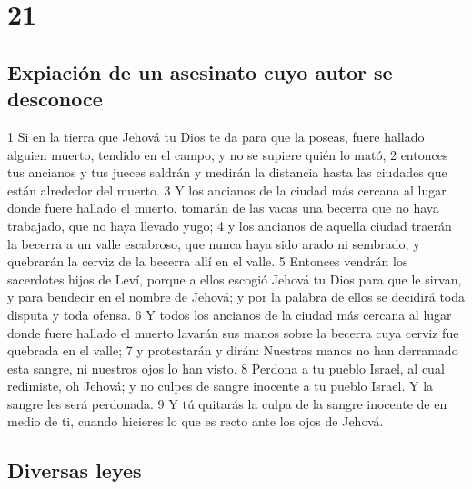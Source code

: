 \chapter{21}

\section{Expiación de un asesinato cuyo autor se desconoce}

1 Si en la tierra que Jehová tu Dios te da para que la poseas, fuere hallado alguien muerto, tendido en el campo, y no se supiere quién lo mató,
2 entonces tus ancianos y tus jueces saldrán y medirán la distancia hasta las ciudades que están alrededor del muerto.
3 Y los ancianos de la ciudad más cercana al lugar donde fuere hallado el muerto, tomarán de las vacas una becerra que no haya trabajado, que no haya llevado yugo;
4 y los ancianos de aquella ciudad traerán la becerra a un valle escabroso, que nunca haya sido arado ni sembrado, y quebrarán la cerviz de la becerra allí en el valle.
5 Entonces vendrán los sacerdotes hijos de Leví, porque a ellos escogió Jehová tu Dios para que le sirvan, y para bendecir en el nombre de Jehová; y por la palabra de ellos se decidirá toda disputa y toda ofensa.
6 Y todos los ancianos de la ciudad más cercana al lugar donde fuere hallado el muerto lavarán sus manos sobre la becerra cuya cerviz fue quebrada en el valle;
7 y protestarán y dirán: Nuestras manos no han derramado esta sangre, ni nuestros ojos lo han visto.
8 Perdona a tu pueblo Israel, al cual redimiste, oh Jehová; y no culpes de sangre inocente a tu pueblo Israel. Y la sangre les será perdonada.
9 Y tú quitarás la culpa de la sangre inocente de en medio de ti, cuando hicieres lo que es recto ante los ojos de Jehová.

\section{Diversas leyes}

